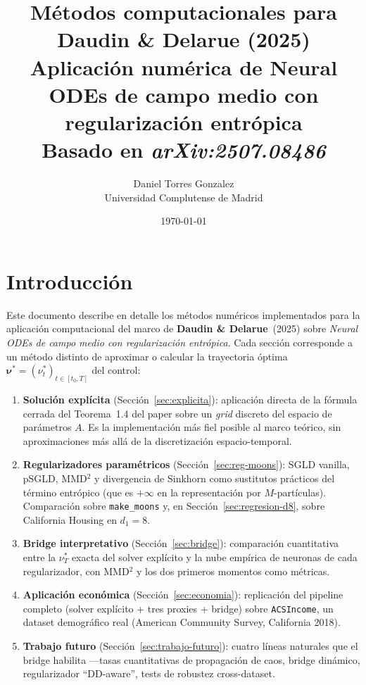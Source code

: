 \documentclass[11pt, a4paper]{article}
\title{\textbf{Métodos computacionales para Daudin \& Delarue (2025)}\\[0.4em]
\large Aplicación numérica de Neural ODEs de campo medio con regularización entrópica\\
\normalsize Basado en \textit{arXiv:2507.08486}}
\author{Daniel Torres Gonzalez \\ Universidad Complutense de Madrid}
\date{\today}
\theoremstyle{definition}
\begin{document}
\maketitle
\tableofcontents
\newpage

\section*{Introducción}

Este documento describe en detalle los métodos numéricos implementados para la
aplicación computacional del marco de \textbf{Daudin \& Delarue}~(2025) sobre
\emph{Neural ODEs de campo medio con regularización entrópica}. Cada sección
corresponde a un método distinto de aproximar o calcular la trayectoria
óptima $\boldsymbol{\nu}^* = (\nu_t^*)_{t \in [t_0, T]}$ del control:

\begin{enumerate}
  \item \textbf{Solución explícita} (Sección~\ref{sec:explicita}): aplicación
        directa de la fórmula cerrada del Teorema~1.4 del paper sobre un
        \emph{grid} discreto del espacio de parámetros $A$. Es la
        implementación más fiel posible al marco teórico, sin aproximaciones
        más allá de la discretización espacio-temporal.
  \item \textbf{Regularizadores paramétricos}
        (Sección~\ref{sec:reg-moons}): SGLD vanilla, pSGLD, MMD$^2$ y
        divergencia de Sinkhorn como sustitutos prácticos del término
        entrópico (que es $+\infty$ en la representación por
        $M$-partículas). Comparación sobre \texttt{make\_moons} y, en
        Sección~\ref{sec:regresion-d8}, sobre California Housing en
        $d_1=8$.
  \item \textbf{Bridge interpretativo} (Sección~\ref{sec:bridge}):
        comparación cuantitativa entre la $\nu^*_T$ exacta del solver
        explícito y la nube empírica de neuronas de cada
        regularizador, con MMD$^2$ y los dos primeros momentos como
        métricas.
  \item \textbf{Aplicación económica}
        (Sección~\ref{sec:economia}): replicación del pipeline
        completo (solver explícito + tres proxies + bridge) sobre
        \texttt{ACSIncome}, un dataset demográfico real
        (American Community Survey, California 2018).
  \item \textbf{Trabajo futuro} (Sección~\ref{sec:trabajo-futuro}):
        cuatro líneas naturales que el bridge habilita ---tasas
        cuantitativas de propagación de caos, bridge dinámico,
        regularizador ``DD-aware'', tests de robustez cross-dataset.
\end{enumerate}
\end{document}
